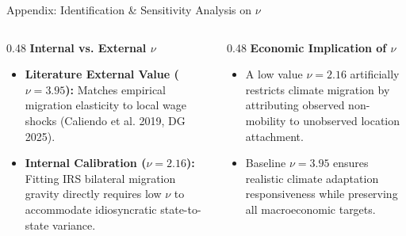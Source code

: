 \documentclass[aspectratio=169, 10pt]{beamer}
\begin{document}
\begin{frame}{Appendix: Identification \& Sensitivity Analysis on $\nu$ \hfill \hyperlink{main:calibration}{\scriptsize{}}}\label{backup:nu_sensitivity}
    \begin{columns}[T]
        \begin{column}{0.48\textwidth}
            \textbf{\small Internal vs. External $\nu$}
            \vspace{0.05cm}
            \begin{itemize}\scriptsize\setlength{\itemsep}{2pt}
                \item \textbf{Literature External Value ($\nu = 3.95$):}
                Matches empirical migration elasticity to local wage shocks (Caliendo et al. 2019, DG 2025).
                \item \textbf{Internal Calibration ($\nu = 2.16$):}
                Fitting IRS bilateral migration gravity directly requires low $\nu$ to accommodate idiosyncratic state-to-state variance.
            \end{itemize}
        \end{column}
        \begin{column}{0.48\textwidth}
            \textbf{\small Economic Implication of $\nu$}
            \vspace{0.05cm}
            \begin{itemize}\scriptsize\setlength{\itemsep}{2pt}
                \item A low value $\nu = 2.16$ artificially restricts climate migration by attributing observed non-mobility to unobserved location attachment.
                \item Baseline $\nu = 3.95$ ensures realistic climate adaptation responsiveness while preserving all macroeconomic targets.
            \end{itemize}
        \end{column}
    \end{columns}
\end{frame}
\end{document}
